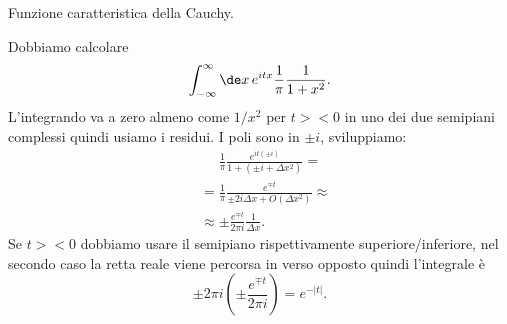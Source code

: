 \begin{exercise}
	Funzione caratteristica della Cauchy.
\end{exercise}

\begin{solution}
	Dobbiamo calcolare
	\begin{equation*}
		\int_{-\infty}^\infty \de x\, e^{itx} \frac1\pi \frac1{1+x^2}.
	\end{equation*}
	L'integrando va a zero almeno come $1/x^2$ per $t><0$ in uno dei due semipiani complessi quindi usiamo i residui.
	I poli sono in $\pm i$, sviluppiamo:
	\begin{align*}
		&\phantom{{}={}} \frac1\pi \frac{e^{it(\pm i)}}{1+ (\pm i + \Delta x^2)} = \\
		&= \frac1\pi \frac{e^{\mp t}}{\pm 2i\Delta x + O(\Delta x^2)} \approx \\
		&\approx \pm\frac{e^{\mp t}}{2\pi i} \frac1{\Delta x}.
	\end{align*}
	Se $t><0$ dobbiamo usare il semipiano rispettivamente superiore/inferiore,
	nel secondo caso la retta reale viene percorsa in verso opposto quindi l'integrale è
	\begin{equation*}
		\pm 2\pi i \left ( \pm\frac{e^{\mp t}}{2\pi i} \right) = e^{-|t|}.
	\end{equation*}
\end{solution}
